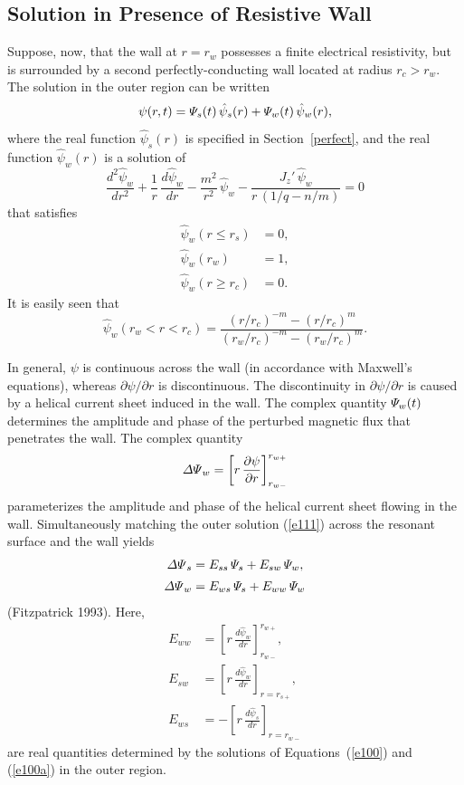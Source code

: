 \documentclass[notitlepage,12pt]{article}
\begin{document}
\subsection{Solution in Presence of Resistive Wall}\label{resistive}
Suppose, now, that the wall at $r=r_w$ possesses a finite electrical resistivity, but is surrounded by a second perfectly-conducting wall
located at radius $r_c>r_w$.
The solution in the outer region can be written
\begin{equation}\label{e111}
\psi(r,t) = {\mit\Psi}_s(t)\,\hat{\psi}_s(r) + {\mit\Psi}_w(t)\,\hat{\psi}_w(r),
\end{equation}
where the real function $\hat{\psi}_s(r)$ is specified in Section~\ref{perfect}, and the real function  $\hat{\psi}_w(r)$ is a solution of 
\begin{equation}\label{e100a}
\frac{d^2\hat{\psi}_w}{dr^2} + \frac{1}{r}\,\frac{d\hat{\psi}_w}{dr}-\frac{m^2}{r^2}\,\hat{\psi}_w - \frac{J_z'\,\hat{\psi}_w}{r\,(1/q-n/m)}= 0
\end{equation}
that satisfies
\begin{align}\label{e101a}
\hat{\psi}_w(r\leq r_s) &= 0,\\[0.5ex]
\hat{\psi}_w(r_w) &= 1,\label{e102a}\\[0.5ex]
\hat{\psi}_w(r\geq r_c) &= 0.\label{e103a}
\end{align}
It is easily seen that
\begin{equation}\label{e117}
\hat{\psi}_w(r_w< r < r_c) = \frac{(r/r_c)^{-m} - (r/r_c)^m}{(r_w/r_c)^{-m} - (r_w/r_c)^m}.
\end{equation}

In general, $\psi$ is continuous across the wall (in accordance with Maxwell's equations), whereas $\partial\psi/\partial r$ is discontinuous. The discontinuity in $\partial\psi/\partial r$ is caused by a helical current sheet induced in the wall. The complex quantity ${\mit\Psi}_w(t)$ determines the amplitude and
phase of the perturbed magnetic flux that penetrates the wall. The complex quantity
\begin{equation}\label{e118}
{\mit\Delta\Psi}_w = \left[r\,\frac{\partial\psi}{\partial r}\right]_{r_{w-}}^{r_{w+}}
\end{equation}
parameterizes the amplitude and phase of the helical current sheet flowing in the wall.
Simultaneously matching the outer solution (\ref{e111}) across the resonant surface and the wall yields
\begin{align}
{\mit\Delta\Psi}_s &= E_{ss}\,{\mit\Psi}_s + E_{sw}\,{\mit\Psi}_w,\\[0.5ex]
{\mit\Delta\Psi}_w &= E_{ws}\,{\mit\Psi}_s+ E_{ww}\,{\mit\Psi}_w
\end{align}
(Fitzpatrick 1993).
Here,
\begin{align}
E_{ww}&= \left[r\,\frac{d\hat{\psi}_w}{dr}\right]_{r_{w-}}^{r_{w+}},\\[0.5ex]
E_{sw} &=\left[r\,\frac{{d\hat\psi}_w}{dr}\right]_{r=r_{s+}},\label{e121}\\[0.5ex]
E_{ws} &=-\left[r\,\frac{{d\hat\psi}_s}{dr}\right]_{r=r_{w-}}\label{e122}
\end{align}
are real quantities determined by the solutions of Equations~(\ref{e100}) and (\ref{e100a}) in the outer region.
\end{document}
